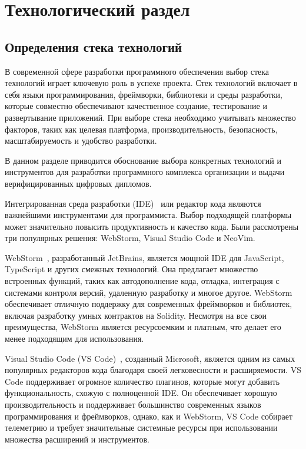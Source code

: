 \section{Технологический раздел}
\label{sec:technological}

\subsection{Определения стека технологий}

В современной сфере разработки программного обеспечения выбор стека технологий играет ключевую роль в успехе проекта. Стек технологий включает в себя языки программирования, фреймворки, библиотеки и среды разработки, которые совместно обеспечивают качественное создание, тестирование и развертывание приложений. При выборе стека необходимо учитывать множество факторов, таких как целевая платформа, производительность, безопасность, масштабируемость и удобство разработки.

В данном разделе приводится обоснование выбора конкретных технологий и инструментов для разработки программного комплекса организации и выдачи верифицированных цифровых дипломов.

Интегрированная среда разработки (IDE)~\cite{bib:ide_is} или редактор кода являются важнейшими инструментами для программиста. Выбор подходящей платформы может значительно повысить продуктивность и качество кода. Были рассмотрены три популярных решения: WebStorm, Visual Studio Code и NeoVim.

WebStorm~\cite{bib:webstorm}, разработанный JetBrains, является мощной IDE для JavaScript, TypeScript и других смежных технологий. Она предлагает множество встроенных функций, таких как автодополнение кода, отладка, интеграция с системами контроля версий, удаленную разработку и многое другое. WebStorm обеспечивает отличную поддержку для современных фреймворков и библиотек, включая разработку умных контрактов на Solidity. Несмотря на все свои преимущества, WebStorm является ресурсоемким и платным, что делает его менее подходящим для использования.

Visual Studio Code (VS Code)~\cite{bib:vscode}, созданный Microsoft, является одним из самых популярных редакторов кода благодаря своей легковесности и расширяемости. VS Code поддерживает огромное количество плагинов, которые могут добавить функциональность, схожую с полноценной IDE. Он обеспечивает хорошую производительность и поддерживает большинство современных языков программирования и фреймворков, однако, как и WebStorm, VS Code собирает телеметрию и требует значительные системные ресурсы при использовании множества расширений и инструментов.

